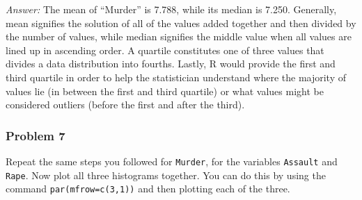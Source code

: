 \documentclass[
]{article}
\newenvironment{Shaded}{\begin{snugshade}}{\end{snugshade}}
\newcommand{\AttributeTok}[1]{\textcolor[rgb]{0.77,0.63,0.00}{#1}}
\newcommand{\FunctionTok}[1]{\textcolor[rgb]{0.00,0.00,0.00}{#1}}
\newcommand{\NormalTok}[1]{#1}
\newcommand{\SpecialCharTok}[1]{\textcolor[rgb]{0.00,0.00,0.00}{#1}}
\newcommand{\StringTok}[1]{\textcolor[rgb]{0.31,0.60,0.02}{#1}}
\begin{document}
\emph{Answer:} The mean of ``Murder'' is 7.788, while its median is
7.250. Generally, mean signifies the solution of all of the values added
together and then divided by the number of values, while median
signifies the middle value when all values are lined up in ascending
order. A quartile constitutes one of three values that divides a data
distribution into fourths. Lastly, R would provide the first and third
quartile in order to help the statistician understand where the majority
of values lie (in between the first and third quartile) or what values
might be considered outliers (before the first and after the third).

\hypertarget{problem-7}{%
\subsubsection{Problem 7}\label{problem-7}}

Repeat the same steps you followed for \texttt{Murder}, for the
variables \texttt{Assault} and \texttt{Rape}. Now plot all three
histograms together. You can do this by using the command
\texttt{par(mfrow=c(3,1))} and then plotting each of the three.

\begin{Shaded}
\end{Shaded}
\end{document}
